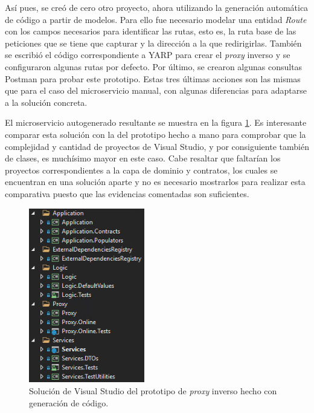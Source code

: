 \documentclass[11pt,spanish,listoffigures]{tfgetsinf}
\begin{document}
Así pues, se creó de cero otro proyecto, ahora utilizando la generación automática de código a partir de modelos. Para ello fue necesario modelar una entidad \emph{Route} con los campos necesarios para identificar las rutas, esto es, la ruta base de las peticiones que se tiene que capturar y la dirección a la que redirigirlas. También se escribió el código correspondiente a YARP para crear el \emph{proxy} inverso y se configuraron algunas rutas por defecto. Por último, se crearon algunas consultas Postman para probar este prototipo. Estas tres últimas acciones son las mismas que para el caso del microservicio manual, con algunas diferencias para adaptarse a la solución concreta.

El microservicio autogenerado resultante se muestra en la figura \ref{prototipoAutogenerado}. Es interesante comparar esta solución con la del prototipo hecho a mano para comprobar que la complejidad y cantidad de proyectos de Visual Studio, y por consiguiente también de clases, es muchísimo mayor en este caso. Cabe resaltar que faltarían los proyectos correspondientes a la capa de dominio y contratos, los cuales se encuentran en una solución aparte y no es necesario mostrarlos para realizar esta comparativa puesto que las evidencias comentadas son suficientes.

\begin{figure}[ht]
\centering
\includegraphics[width=0.45\textwidth]{imagenes/prototipoAutogenerado}
\caption{Solución de Visual Studio del prototipo de \emph{proxy} inverso hecho con generación de código.}
	\label{prototipoAutogenerado}
\end{figure}

\end{document}
